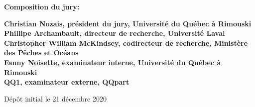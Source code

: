 \thispagestyle{empty}

\null
\vfill
\noindent \textbf{Composition du jury:}\\
\vspace{1cm}

\begin{singlespace}
  \noindent \textbf{Christian Nozais, président du jury, Université du Québec à Rimouski}\\

  \noindent \textbf{Phillipe Archambault, directeur de recherche, Université Laval}\\

  \noindent \textbf{Christopher William McKindsey, codirecteur de recherche, Ministère des Pêches et Océans}\\

  \noindent \textbf{Fanny Noisette, examinateur interne, Université du Québec à Rimouski}\\

  \noindent \textbf{QQ1, examinateur externe, QQpart}\\
\end{singlespace}

\vspace{2cm}
\noindent Dépôt initial le 21 décembre 2020
\hspace{3cm}


\cleardoublepage
